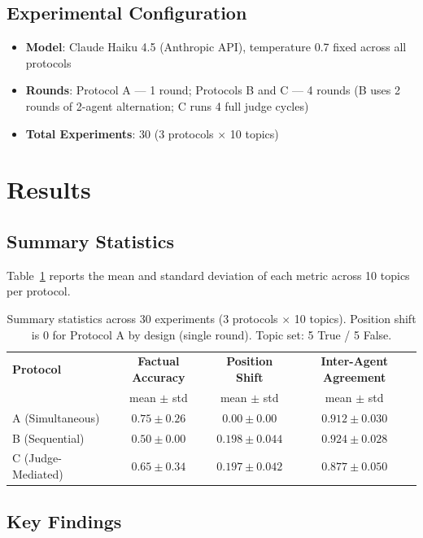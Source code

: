 \documentclass[11pt, oneside]{article}
\begin{document}
\subsection{Experimental Configuration}

\begin{itemize}
\item \textbf{Model}: Claude Haiku 4.5 (Anthropic API), temperature 0.7 fixed across all protocols
\item \textbf{Rounds}: Protocol A — 1 round; Protocols B and C — 4 rounds (B uses 2 rounds of 2-agent alternation; C runs 4 full judge cycles)
\item \textbf{Total Experiments}: $30$ (3 protocols $\times$ 10 topics)
\end{itemize}

\section{Results}

\subsection{Summary Statistics}

Table~\ref{tab:results} reports the mean and standard deviation of each metric across 10 topics per protocol.

\begin{table}[h]
\centering
\caption{Summary statistics across 30 experiments (3 protocols $\times$ 10 topics). Position shift is 0 for Protocol A by design (single round). Topic set: 5 True / 5 False.}
\label{tab:results}
\begin{tabular}{lccc}
\toprule
\textbf{Protocol} & \textbf{Factual Accuracy} & \textbf{Position Shift} & \textbf{Inter-Agent Agreement} \\
                  & mean $\pm$ std            & mean $\pm$ std          & mean $\pm$ std \\
\midrule
A (Simultaneous)   & $0.75 \pm 0.26$ & $0.00 \pm 0.00$ & $0.912 \pm 0.030$ \\
B (Sequential)     & $0.50 \pm 0.00$ & $0.198 \pm 0.044$ & $0.924 \pm 0.028$ \\
C (Judge-Mediated) & $0.65 \pm 0.34$ & $0.197 \pm 0.042$ & $0.877 \pm 0.050$ \\
\bottomrule
\end{tabular}
\end{table}

\subsection{Key Findings}
\end{document}
